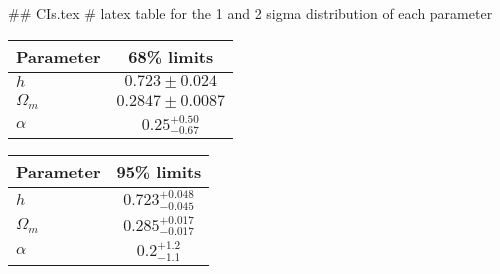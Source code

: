 ## CIs.tex
# latex table for the 1 and 2 sigma distribution of each parameter

\begin{tabular} { l  c}
 Parameter &  68\% limits\\
\hline
{\boldmath$h              $} & $0.723\pm 0.024            $\\
{\boldmath$\Omega_m       $} & $0.2847\pm 0.0087          $\\
{\boldmath$\alpha         $} & $0.25^{+0.50}_{-0.67}      $\\
\hline
\end{tabular}

\begin{tabular} { l  c}
 Parameter &  95\% limits\\
\hline
{\boldmath$h              $} & $0.723^{+0.048}_{-0.045}   $\\
{\boldmath$\Omega_m       $} & $0.285^{+0.017}_{-0.017}   $\\
{\boldmath$\alpha         $} & $0.2^{+1.2}_{-1.1}         $\\
\hline
\end{tabular}
